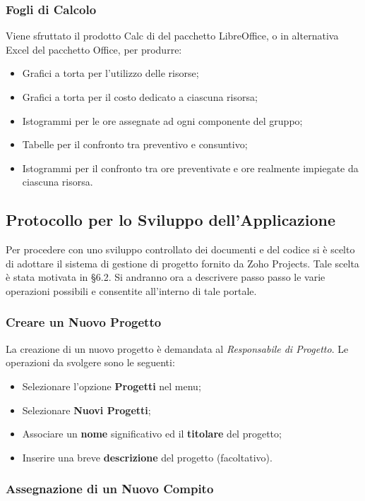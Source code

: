 \subsubsection{Fogli di Calcolo}
Viene sfruttato il prodotto Calc di del pacchetto LibreOffice, o in alternativa Excel del pacchetto Office, per produrre:
\begin{itemize}
\item Grafici a torta per l'utilizzo delle risorse;
\item Grafici a torta per il costo dedicato a ciascuna risorsa;
\item Istogrammi per le ore assegnate ad ogni componente del gruppo;
\item Tabelle per il confronto tra preventivo e consuntivo;
\item Istogrammi per il confronto tra ore preventivate e ore realmente impiegate da ciascuna risorsa.
\end{itemize}

\subsection{Protocollo per lo Sviluppo dell'Applicazione}

Per procedere con uno sviluppo controllato dei documenti e del codice si è scelto di adottare il sistema di gestione di progetto fornito da Zoho Projects. Tale scelta è stata motivata in §6.2. Si andranno ora a descrivere passo passo le varie operazioni possibili e consentite all'interno di tale portale.

\subsubsection{Creare un Nuovo Progetto}

La creazione di un nuovo progetto è demandata al \textit{Responsabile di Progetto}. Le operazioni da svolgere sono le seguenti:
\begin{itemize}
\item Selezionare l'opzione \textbf{Progetti} nel menu;
\item Selezionare \textbf{Nuovi Progetti};
\item Associare un \textbf{nome} significativo ed il \textbf{titolare} del progetto;
\item Inserire una breve \textbf{descrizione} del progetto (facoltativo).
\end{itemize}

\subsubsection{Assegnazione di un Nuovo Compito}

